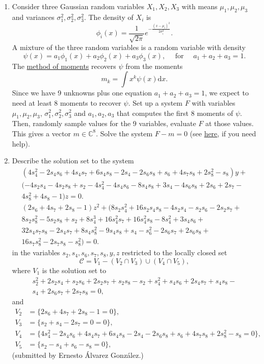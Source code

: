 \documentclass[11pt,reqno]{amsart}
\theoremstyle{definition}
\theoremstyle{remark}
\numberwithin{equation}{section}
\begin{document}
\begin{enumerate}
\item Consider three Gaussian random variables $X_1,X_2,X_3$ with means $\mu_1,\mu_2,\mu_3$ and variances $\sigma_1^2,\sigma_2^2,\sigma_3^2$. The density of $X_i$ is
$$\phi_i(x) = \frac{1}{\sqrt{2\pi}} e^{-\frac{(x-\mu_i)^2}{2\sigma_i^2}}.$$
A mixture of the three random variables is a random variable with density
$$\psi(x) = a_1 \phi_1(x) + a_2 \phi_2(x) + a_3 \phi_3(x), \quad\text{   for } \quad  a_1+a_2+a_3 =1.$$
The \href{https://en.wikipedia.org/wiki/Method_of_moments_(statistics)}{method of moments} recovers $\psi$ from the moments
  $$m_k = \int x^k \psi(x) \mathrm{d}x.$$
Since we have 9 unknowns plus one equation $a_1+a_2+a_3=1$, we expect to need at least 8 moments to recover $\psi$. Set up a system $F$ with variables $\mu_1,\mu_2,\mu_3$, $\sigma_1^2,\sigma_2^2,\sigma_3^2$ and $a_1,a_2,a_3$ that computes the first 8 moments of $\psi$. Then, randomly sample values for the 9 variables, evaluate $F$ at those values. This gives a vector $m\in \mathbb C^8$. Solve the system $F-m=0$ (see \href{https://www.juliahomotopycontinuation.org/examples/method-of-moments/}{here}, if you need help).

\item Describe the solution set to the system
\begin{align*}
(4s_4^2-2s_4s_6+4s_4s_7+6s_4s_8-2s_4-2s_6s_8+s_6+4s_7s_8+2s_8^2-s_8)y+\\
(-4s_2s_4-4s_2s_8+s_2-4s_4^2-4s_4s_6-8s_4s_8+3s_4-4s_6s_8+2s_6+2s_7- \\
4s_8^2+4s_8-1)z = 0.\\
(2s_6+4s_7+2s_8-1)z^2+(8s_2s_4^2+16s_2s_4s_8-4s_2s_4-s_2s_6-2s_2s_7+ \\
8s_2s_8^2-5s_2s_8+s_2+8s_4^3+16s_4^2s_7+16s_4^2s_8-8s_4^2+3s_4s_6+ \\
32s_4s_7s_8-2s_4s_7+8s_4s_8^2-9s_4s_8+s_4-s_6^2-2s_6s_7+2s_6s_8+\\
16s_7s_8^2-2s_7s_8-s_8^2) = 0.
\end{align*}
in the variables $s_2,s_4,s_6,s_7,s_8, y,z$ restricted to the locally closed set
$$\mathcal{C} = {V}_1-({V}_2\cap{V}_3)\cup({V}_4\cap{V}_5),$$
where ${V}_1$ is the solution set to
\begin{align*}
s_2^2+2s_2s_4+s_2s_6+2s_2s_7+s_2s_8-s_2+s_4^2+s_4s_6+2s_4s_7+s_4s_8-\\
s_4+2s_6s_7+2s_7s_8 = 0,
\end{align*}
and
\begin{align*}
{V}_2  &= \{2s_6+4s_7+2s_8-1 = 0\},\\
{V}_3  &= \{s_2+s_4-2s_7 = 0 = 0\},\\
{V}_4  &= \{4s_4^2-2s_4s_6+4s_4s_7+6s_4s_8-2s_4-2s_6s_8+s_6+4s_7s_8+2s_8^2-s_8  = 0\},\\
{V}_5  &= \{s_2-s_4+s_6-s_8 = 0\},
\end{align*}
(submitted by Ernesto \'{A}lvarez Gonz\'{a}lez.)
\end{enumerate}
\end{document}
